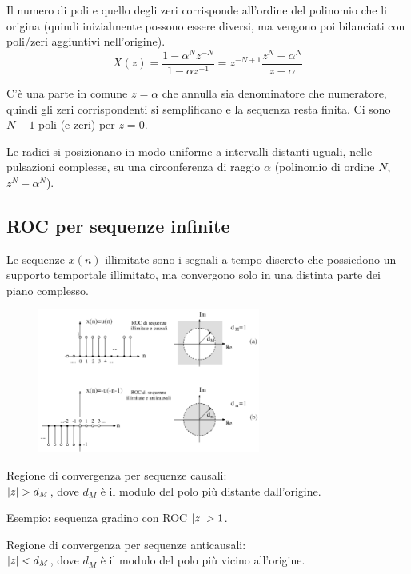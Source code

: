 Il numero di poli e quello degli zeri corrisponde all'ordine del polinomio che li origina (quindi inizialmente possono essere diversi, ma vengono poi bilanciati con poli/zeri aggiuntivi nell'origine).
$$X(z) = \frac{1 - \alpha^Nz^{-N}}{1 - \alpha z^{-1}} = z^{-N+1} \frac{z^N - \alpha^N}{z - \alpha}$$

C'è una parte in comune $z = \alpha$ che annulla sia denominatore che numeratore, quindi gli zeri corrispondenti si semplificano e la sequenza resta finita. Ci sono $N - 1$ poli (e zeri) per $z = 0$.

Le radici si posizionano in modo uniforme a intervalli distanti uguali, nelle pulsazioni complesse, su una circonferenza di raggio $\alpha$ (polinomio di ordine $N$, $z^N - \alpha^N$).

\subsection{ROC per sequenze infinite}
Le sequenze $x(n)$ illimitate sono i segnali a tempo discreto che possiedono un supporto temportale illimitato, ma convergono solo in una distinta parte dei piano complesso. 

\begin{figure}
	\vspace{-20pt}
	\includegraphics[width=0.65\textwidth]{Lezioni/Immagini/rocinf}
	\vspace{-35pt}
\end{figure}

Regione di convergenza per sequenze causali: \\
$\left|z\right| > d_M$, dove $d_M$ è il modulo del polo più distante dall'origine.

Esempio: sequenza gradino con ROC $\left|z\right| > 1$.

Regione di convergenza per sequenze anticausali: \\
$\left|z\right| < d_M$, dove $d_M$ è il modulo del polo più vicino all'origine. 

